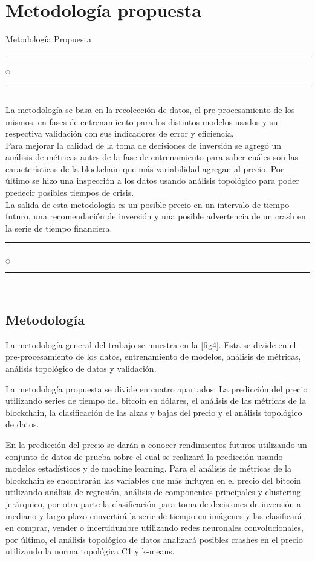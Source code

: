 \chapter[Metodología]{Metodología propuesta}{Metodología Propuesta}\label{Metodologia}

\noindent
\rule{0.49\textwidth}{0.75pt} $_{\bigcirc}$ \rule{0.49\textwidth}{0.75pt}\\

La metodología se basa en la recolección de datos, el pre-procesamiento de los mismos, en fases de entrenamiento para los distintos modelos usados y su respectiva validación con sus indicadores de error y eficiencia.\\
Para mejorar la calidad de la toma de decisiones de inversión se agregó un análisis de métricas antes de la fase de entrenamiento para saber cuáles son las características de la blockchain que más variabilidad agregan al precio. Por último se hizo una inspección a los datos usando análisis topológico para poder predecir posibles tiempos de crisis.\\
La salida de esta metodología es un posible precio en un intervalo de tiempo futuro, una recomendación de inversión y una posible advertencia de un crash en la serie de tiempo financiera.\\

\noindent
\rule{0.49\textwidth}{0.75pt} $_{\bigcirc}$ \rule{0.49\textwidth}{0.75pt}\\
\clearpage

\section{Metodología}
La metodología general del trabajo se muestra en la \autoref{fig4}. Esta se divide en el pre-procesamiento de los datos, entrenamiento de modelos, análisis de métricas, análisis topológico de datos y validación.

La metodología propuesta se divide en cuatro apartados: La predicción del precio utilizando series de tiempo del bitcoin en dólares, el análisis de las métricas de la blockchain, la clasificación de las alzas y bajas del precio y el análisis topológico de datos.
 
En la predicción del precio se darán a conocer rendimientos futuros utilizando un conjunto de datos de prueba sobre el cual se realizará la predicción usando modelos estadísticos y de machine learning. Para el análisis de métricas de la blockchain se encontrarán las variables que más influyen en el precio del bitcoin utilizando análisis de regresión, análisis de componentes principales y clustering jerárquico, por otra parte la clasificación para toma de decisiones de inversión a mediano y largo plazo convertirá la serie de tiempo en imágenes y las clasificará en comprar, vender o incertidumbre utilizando redes neuronales convolucionales, por último, el análisis topológico de datos analizará posibles crashes en el precio utilizando la norma topológica C1 y k-means. 
\vspace{-0.59cm}
